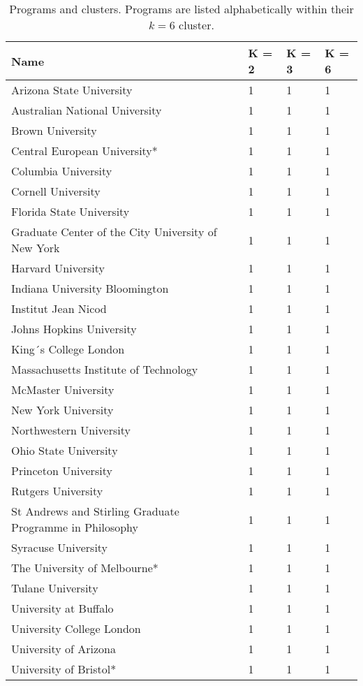 
\begin{longtable}[t]{llll}
\caption{\label{tab:university.cluster}Programs and clusters.  Programs are listed alphabetically within their $k=6$ cluster.}\\
\toprule
Name & K = 2 & K = 3 & K = 6\\
\midrule
Arizona State University & 1 & 1 & 1\\
Australian National University & 1 & 1 & 1\\
Brown University & 1 & 1 & 1\\
Central European University* & 1 & 1 & 1\\
Columbia University & 1 & 1 & 1\\
\addlinespace
Cornell University & 1 & 1 & 1\\
Florida State University & 1 & 1 & 1\\
Graduate Center of the City University of New York & 1 & 1 & 1\\
Harvard University & 1 & 1 & 1\\
Indiana University Bloomington & 1 & 1 & 1\\
\addlinespace
Institut Jean Nicod & 1 & 1 & 1\\
Johns Hopkins University & 1 & 1 & 1\\
King´s College London & 1 & 1 & 1\\
Massachusetts Institute of Technology & 1 & 1 & 1\\
McMaster University & 1 & 1 & 1\\
\addlinespace
New York University & 1 & 1 & 1\\
Northwestern University & 1 & 1 & 1\\
Ohio State University & 1 & 1 & 1\\
Princeton University & 1 & 1 & 1\\
Rutgers University & 1 & 1 & 1\\
\addlinespace
St Andrews and Stirling Graduate Programme in Philosophy & 1 & 1 & 1\\
Syracuse University & 1 & 1 & 1\\
The University of Melbourne* & 1 & 1 & 1\\
Tulane University & 1 & 1 & 1\\
University at Buffalo & 1 & 1 & 1\\
\addlinespace
University College London & 1 & 1 & 1\\
University of Arizona & 1 & 1 & 1\\
University of Bristol* & 1 & 1 & 1\\

\end{longtable}
